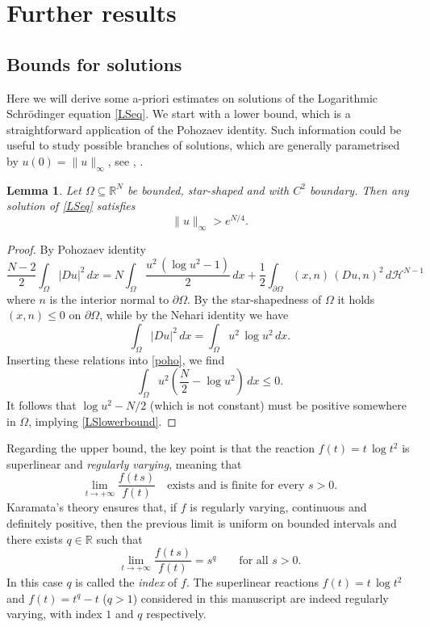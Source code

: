 \documentclass[12pt]{amsart}
\numberwithin{equation}{section}
\theoremstyle{plain}
\newtheorem{lemma}[theorem]{Lemma}
\theoremstyle{plain}
\theoremstyle{plain}
\theoremstyle{definition}
\newcommand{\R}{{\mathbb R}}
\newcommand{\beq}{\begin{equation}}
\newcommand{\eeq}{\end{equation}}
\renewcommand{\le}{\leqslant}
\newcommand{\cal}{\mathcal}
\begin{document}
\section{Further results}
\label{sec6}


\subsection{Bounds for solutions }
Here we will derive some a-priori estimates on solutions of the Logarithmic Schr\"odinger equation \eqref{LSeq}. We start with a lower bound, which is a straightforward application of the Pohozaev identity. 
Such information could be useful to study possible branches of solutions, which are generally parametrised by $u(0)=\|u\|_{\infty}$, see \cite[Remark 5]{Dan95}, \cite[Theorem 3.3]{DGP99}. 
\begin{lemma}
Let $\Omega\subseteq\R^N$ be bounded, star-shaped and with $C^2$ boundary. 
Then any solution of \eqref{LSeq} satisfies
\beq
\label{LSlowerbound}
\|u\|_\infty> e^{N/4}.
\eeq
\end{lemma}

\begin{proof}
By Pohozaev identity
\beq
\label{poho}
\frac{N-2}{2}\int_\Omega |Du|^2\, dx= N \int_\Omega\frac{u^2\, (\log u^2-1)}{2}\, dx+\frac{1}{2}\int_{\partial\Omega} (x, n)\, \left(D u, n\right)^2\, d{\cal H}^{N-1}
\eeq
where $n$ is the interior normal to $\partial\Omega$.
By the star-shapedness of $\Omega$ it holds $(x, n)\le 0$ on $\partial\Omega$, while by the Nehari identity we have
\[
\int_\Omega |Du|^2\, dx=\int_\Omega u^2\, \log u^2\, dx.
\]
Inserting these relations into \eqref{poho}, we find
\[
\int_\Omega u^2\left(\frac{N}{2}-\log u^2\right)\, dx\le 0.
\]
It follows that $\log u^2-N/2$ (which is not constant) must be positive somewhere in $\Omega$, implying \eqref{LSlowerbound}.
\end{proof}

Regarding the upper bound, the key point is that the reaction $f(t)=t\, \log t^2$ is superlinear and {\em regularly varying}, meaning that 
\[
\lim_{t\to +\infty} \frac{f(t\, s)}{f(t)}\quad \text{exists and is finite for every $s> 0$}.
\]
Karamata's theory \cite[Theorems 1.2.1 and 1.4.1]{BGT87} ensures that, if $f$ is regularly varying, continuous and definitely positive, then the previous limit is uniform on bounded intervals and there exists $q\in \R$ such that 
\beq
\label{regvar}
 \lim_{t\to +\infty} \frac{f(t\, s)}{f(t)}=s^q\qquad \text{for all $s>0$}.
 \eeq
 In this case $q$ is called the {\em index} of $f$. 
 The superlinear reactions $f(t)=t\, \log t^2$ and $f(t)=t^q-t$ ($q>1$) considered in this manuscript are indeed regularly varying, with index $1$ and $q$ respectively.
\end{document}
